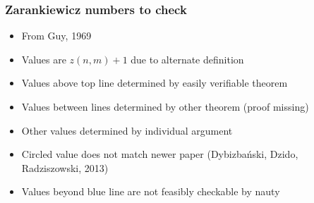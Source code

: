 \documentclass[pdf,hyperref={urlbordercolor={0 1 1}},xcolor=pdftex,dvipsnames]{beamer}
\begin{document}
\begin{frame}[noframenumbering]
  \frametitle{Zarankiewicz numbers to check}
  \begin{center}
    \begin{minipage}[b]{.47\textwidth}
    \end{minipage}
    \begin{minipage}[b]{.47\textwidth}
      \begin{itemize}
        \item From Guy, 1969
        \item Values are $z(n,m)+1$ due to alternate definition
        \item Values above top line determined by easily verifiable theorem
      \end{itemize}
    \end{minipage}
    \begin{itemize}
      \item Values between lines determined by other theorem (proof missing)
      \item Other values determined by individual argument
      \item Circled value does not match newer paper (Dybizba\'nski, Dzido, 
        Radziszowski, 2013)
      \item Values beyond blue line are not feasibly checkable by nauty
    \end{itemize}
  \end{center}
\end{frame}
\end{document}
